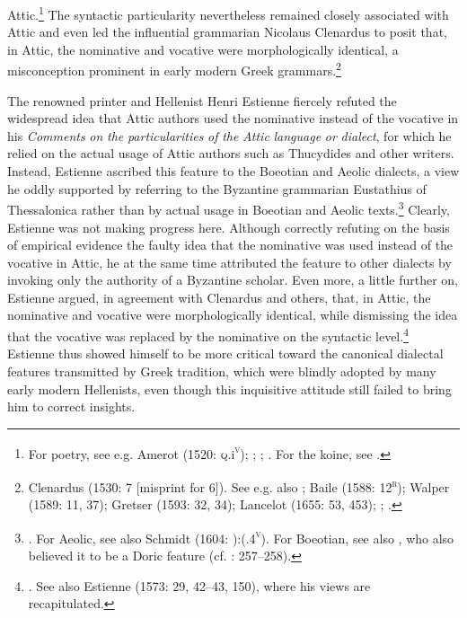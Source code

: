 Attic.\footnote{For poetry, see e.g. Amerot (1520: \textsc{q.}i\textsc{\textsuperscript{v}}); \citet[129]{Antesignanus1554}; \citet[34]{Gretser1593}; \citet[157]{Schmidt1604}. For the koine, see \citet[54]{Lancelot1655}.} The syntactic particularity nevertheless remained closely associated with Attic and even led the influential grammarian Nicolaus Clenardus to posit that, in Attic, the nominative and vocative were morphologically identical, a misconception prominent in early modern Greek grammars.\footnote{Clenardus (1530: 7 [misprint for 6]). See e.g. also \citet[534]{Crusius1558}; Baile (1588: 12\textsc{\textsuperscript{r}}); Walper (1589: 11, 37); Gretser (1593: 32, 34); Lancelot (1655: 53, 453); \citet[101]{Giraudeau1739}; \citet[20]{Facius1782}.}

The renowned printer and Hellenist Henri Estienne fiercely refuted the widespread idea that Attic authors used the nominative instead of the vocative in his \textit{Comments} \textit{on} \textit{the} \textit{particularities} \textit{of} \textit{the} \textit{Attic} \textit{language} \textit{or} \textit{dialect}, for which he relied on the actual usage of Attic authors such as Thucydides and other writers. Instead, Estienne ascribed this feature to the Boeotian and Aeolic dialects, a view he oddly supported by referring to the Byzantine grammarian Eustathius of Thessalonica rather than by actual usage in Boeotian and Aeolic texts.\footnote{\citet[15]{Estienne1573}. For Aeolic, see also Schmidt (1604: ):(.4\textsc{\textsuperscript{v}}). For Boeotian, see also \citet[71]{Mérigon1621}, who also believed it to be a Doric feature (cf. \citealt{Maittaire1706}: 257–258).} Clearly, Estienne was not making progress here. Although correctly refuting on the basis of empirical evidence the faulty idea that the nominative was used instead of the vocative in Attic, he at the same time attributed the feature to other dialects by invoking only the authority of a Byzantine scholar. Even more, a little further on, Estienne argued, in agreement with Clenardus and others, that, in Attic, the nominative and vocative were morphologically identical, while dismissing the idea that the vocative was replaced by the nominative on the syntactic level.\footnote{\citet[17]{Estienne1573}. See also Estienne (1573: 29, 42–43, 150), where his views are recapitulated.} Estienne thus showed himself to be more critical toward the canonical dialectal features transmitted by Greek tradition, which were blindly adopted by many early modern Hellenists, even though this inquisitive attitude still failed to bring him to correct insights.

